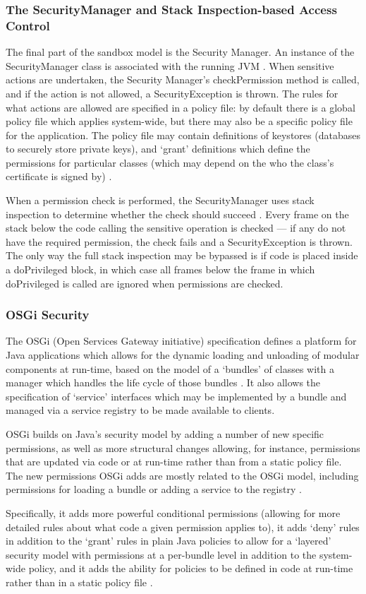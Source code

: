 \subsubsection{The SecurityManager and Stack Inspection-based Access Control}

The final part of the sandbox model is the Security Manager. An instance of the SecurityManager class is associated with the running JVM \cite{gosling2014java}. When sensitive actions are undertaken, the Security Manager's checkPermission method is called, and if the action is not allowed, a SecurityException is thrown. The rules for what actions are allowed are specified in a policy file: by default there is a global policy file which applies system-wide, but there may also be a specific policy file for the application. The policy file may contain definitions of keystores (databases to securely store private keys), and `grant' definitions which define the permissions for particular classes (which may depend on the who the class's certificate is signed by) \cite{gosling2014java}.

When a permission check is performed, the SecurityManager uses stack inspection to determine whether the check should succeed \cite{gong2003javasecurity}. Every frame on the stack below the code calling the sensitive operation is checked --- if any do not have the required permission, the check fails and a SecurityException is thrown. The only way the full stack inspection may be bypassed is if code is placed inside a doPrivileged block, in which case \cite{gong2003javasecurity} all frames below the frame in which doPrivileged is called are ignored when permissions are checked.


\subsubsection{OSGi Security}

The OSGi (Open Services Gateway initiative) specification defines a platform for Java applications which allows for the dynamic loading and unloading of modular components at run-time, based on the model of a `bundles' of classes with a manager which handles the life cycle of those bundles \cite{osgi2014osgi}. It also allows the specification of `service' interfaces which may be implemented by a bundle and managed via a service registry to be made available to clients.

OSGi builds on Java's security model by adding a number of new specific permissions, as well as more structural changes allowing, for instance, permissions that are updated via code or at run-time rather than from a static policy file. The new permissions OSGi adds are mostly related to the OSGi model, including permissions for loading a bundle or adding a service to the registry \cite{hall2011osgi}.

Specifically, it adds more powerful conditional permissions (allowing for more detailed rules about what code a given permission applies to), it adds `deny' rules in addition to the `grant' rules in plain Java policies to allow for a `layered' security model with permissions at a per-bundle level in addition to the system-wide policy, and it adds the ability for policies to be defined in code at run-time rather than in a static policy file \cite{hall2011osgi}.
